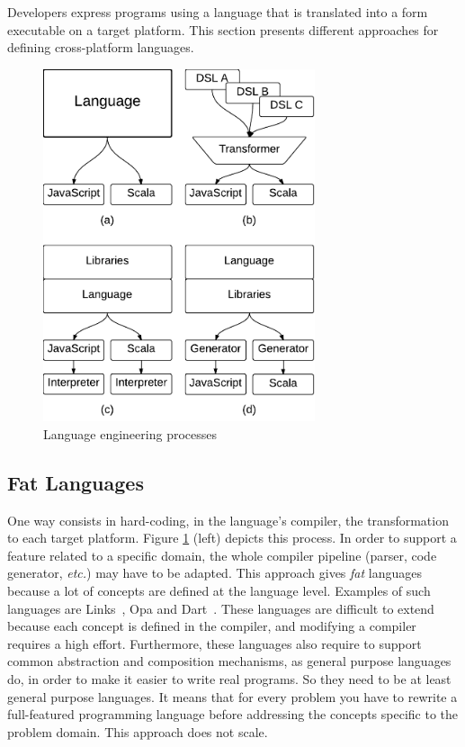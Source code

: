 \documentclass[preprint]{sigplanconf}
\newcommand{\etc}{\emph{etc.}}
\begin{document}
Developers express programs using a language that is translated into a form executable on a target platform. This
section presents different approaches for defining cross-platform languages.

\begin{figure}
  \centering
  \includegraphics[width=8cm]{langs.pdf}
  \caption{Language engineering processes}
  \label{langs}
\end{figure}

\subsection{Fat Languages}

One way consists in hard-coding, in the language's compiler, the transformation to each target platform. Figure
\ref{langs} (left) depicts this process. In order to support a feature related to a specific domain, the whole
compiler pipeline (parser, code generator, \etc) may have to be adapted. This approach gives \emph{fat} languages
because a lot of concepts are defined at the language level. Examples of such languages are
Links~\cite{Cooper07_Links}, Opa and Dart~\cite{Griffith11_Dart}. These languages are difficult to extend because
each concept is defined in the compiler, and modifying a compiler requires a high effort. Furthermore, these
languages also require to support common abstraction and composition mechanisms, as general purpose languages do, in
order to make it easier to write real programs. So they need to be at least general purpose languages. It means that
for every problem you have to rewrite a full-featured programming language before addressing the concepts specific to
the problem domain. This approach does not scale.
\end{document}
